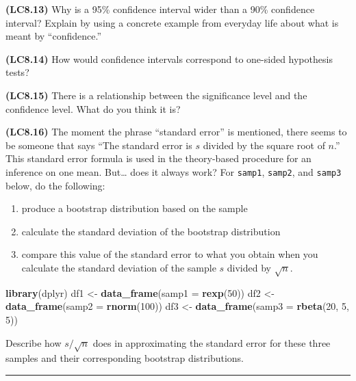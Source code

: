 \documentclass[]{tufte-book}
\newenvironment{Shaded}{\begin{snugshade}}{\end{snugshade}}
\newcommand{\KeywordTok}[1]{\textcolor[rgb]{0.13,0.29,0.53}{\textbf{{#1}}}}
\newcommand{\DataTypeTok}[1]{\textcolor[rgb]{0.13,0.29,0.53}{{#1}}}
\newcommand{\DecValTok}[1]{\textcolor[rgb]{0.00,0.00,0.81}{{#1}}}
\newcommand{\StringTok}[1]{\textcolor[rgb]{0.31,0.60,0.02}{{#1}}}
\newcommand{\NormalTok}[1]{{#1}}
\let\oldrule=\rule
\renewcommand{\rule}[1]{\oldrule{\linewidth}}
\providecommand{\tightlist}{%
  \setlength{\itemsep}{0pt}\setlength{\parskip}{0pt}}
\theoremstyle{definition}
\theoremstyle{definition}
\theoremstyle{remark}
\begin{document}
\textbf{(LC8.13)} Why is a 95\% confidence interval wider than a 90\%
confidence interval? Explain by using a concrete example from everyday
life about what is meant by ``confidence.''

\textbf{(LC8.14)} How would confidence intervals correspond to one-sided
hypothesis tests?

\textbf{(LC8.15)} There is a relationship between the significance level
and the confidence level. What do you think it is?

\textbf{(LC8.16)} The moment the phrase ``standard error'' is mentioned,
there seems to be someone that says ``The standard error is \(s\)
divided by the square root of \(n\).'' This standard error formula is
used in the theory-based procedure for an inference on one mean.
But\ldots{} does it always work? For \texttt{samp1}, \texttt{samp2}, and
\texttt{samp3} below, do the following:

\begin{enumerate}
\def\labelenumi{\arabic{enumi}.}
\tightlist
\item
  produce a bootstrap distribution based on the sample
\item
  calculate the standard deviation of the bootstrap distribution
\item
  compare this value of the standard error to what you obtain when you
  calculate the standard deviation of the sample \(s\) divided by
  \(\sqrt{n}\).
\end{enumerate}

\begin{Shaded}
\begin{Highlighting}[]
\KeywordTok{library}\NormalTok{(dplyr)}
\NormalTok{df1 <-}\StringTok{ }\KeywordTok{data_frame}\NormalTok{(}\DataTypeTok{samp1 =} \KeywordTok{rexp}\NormalTok{(}\DecValTok{50}\NormalTok{))}
\NormalTok{df2 <-}\StringTok{ }\KeywordTok{data_frame}\NormalTok{(}\DataTypeTok{samp2 =} \KeywordTok{rnorm}\NormalTok{(}\DecValTok{100}\NormalTok{))}
\NormalTok{df3 <-}\StringTok{ }\KeywordTok{data_frame}\NormalTok{(}\DataTypeTok{samp3 =} \KeywordTok{rbeta}\NormalTok{(}\DecValTok{20}\NormalTok{, }\DecValTok{5}\NormalTok{, }\DecValTok{5}\NormalTok{))}
\end{Highlighting}
\end{Shaded}

Describe how \(s / \sqrt{n}\) does in approximating the standard error
for these three samples and their corresponding bootstrap distributions.

\begin{center}\rule{0.5\linewidth}{\linethickness}\end{center}
\end{document}
